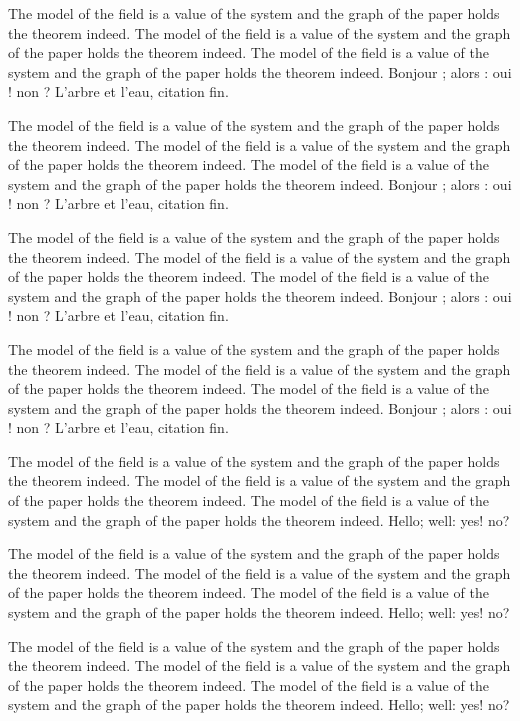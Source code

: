 \documentclass{article}
\begin{document}
The model of the field is a value of the system and the graph of the paper holds the theorem indeed. The model of the field is a value of the system and the graph of the paper holds the theorem indeed. The model of the field is a value of the system and the graph of the paper holds the theorem indeed. Bonjour ; alors : oui ! non ? L'arbre et l'eau, \og citation \fg{} fin.

The model of the field is a value of the system and the graph of the paper holds the theorem indeed. The model of the field is a value of the system and the graph of the paper holds the theorem indeed. The model of the field is a value of the system and the graph of the paper holds the theorem indeed. Bonjour ; alors : oui ! non ? L'arbre et l'eau, \og citation \fg{} fin.

The model of the field is a value of the system and the graph of the paper holds the theorem indeed. The model of the field is a value of the system and the graph of the paper holds the theorem indeed. The model of the field is a value of the system and the graph of the paper holds the theorem indeed. Bonjour ; alors : oui ! non ? L'arbre et l'eau, \og citation \fg{} fin.

The model of the field is a value of the system and the graph of the paper holds the theorem indeed. The model of the field is a value of the system and the graph of the paper holds the theorem indeed. The model of the field is a value of the system and the graph of the paper holds the theorem indeed. Bonjour ; alors : oui ! non ? L'arbre et l'eau, \og citation \fg{} fin.


The model of the field is a value of the system and the graph of the paper holds the theorem indeed. The model of the field is a value of the system and the graph of the paper holds the theorem indeed. The model of the field is a value of the system and the graph of the paper holds the theorem indeed. Hello; well: yes! no?

The model of the field is a value of the system and the graph of the paper holds the theorem indeed. The model of the field is a value of the system and the graph of the paper holds the theorem indeed. The model of the field is a value of the system and the graph of the paper holds the theorem indeed. Hello; well: yes! no?

The model of the field is a value of the system and the graph of the paper holds the theorem indeed. The model of the field is a value of the system and the graph of the paper holds the theorem indeed. The model of the field is a value of the system and the graph of the paper holds the theorem indeed. Hello; well: yes! no?
\end{document}
